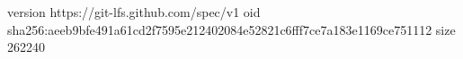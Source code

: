 version https://git-lfs.github.com/spec/v1
oid sha256:aeeb9bfe491a61cd2f7595e212402084e52821c6fff7ce7a183e1169ce751112
size 262240
